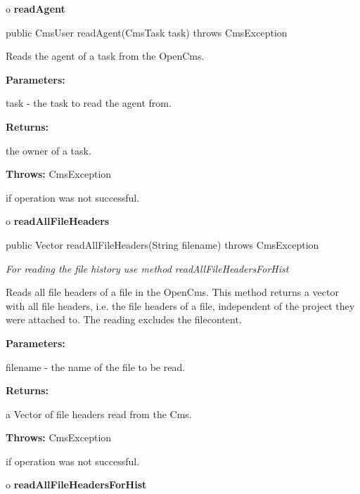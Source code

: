 o {\bf readAgent}

\begin{PRE}
 public CmsUser readAgent(CmsTask task) throws CmsException
\end{PRE}

\begin{description}
\htmlDD Reads the agent of a task from the OpenCms.

\begin{description}
\item {\bf Parameters:}

task - the task to read the agent from.
\item {\bf Returns:}

the owner of a task.
\item {\bf Throws:} CmsException

if operation was not successful.
\end{description}

\end{description}

o {\bf readAllFileHeaders}

\begin{PRE}
 public Vector readAllFileHeaders(String filename) throws CmsException
\end{PRE}

\begin{description}
 {\it For reading the
file history use method readAllFileHeadersForHist}

Reads all file headers of a file in the OpenCms. \htmlBR
This method returns a vector with all file headers, i.e. the file headers of a
file, independent of the project they were attached to.\htmlBR
The reading excludes the filecontent.

\begin{description}
\item {\bf Parameters:}

filename - the name of the file to be read.
\item {\bf Returns:}

a Vector of file headers read from the Cms.
\item {\bf Throws:} CmsException

if operation was not successful.
\end{description}

\end{description}

o {\bf readAllFileHeadersForHist}

